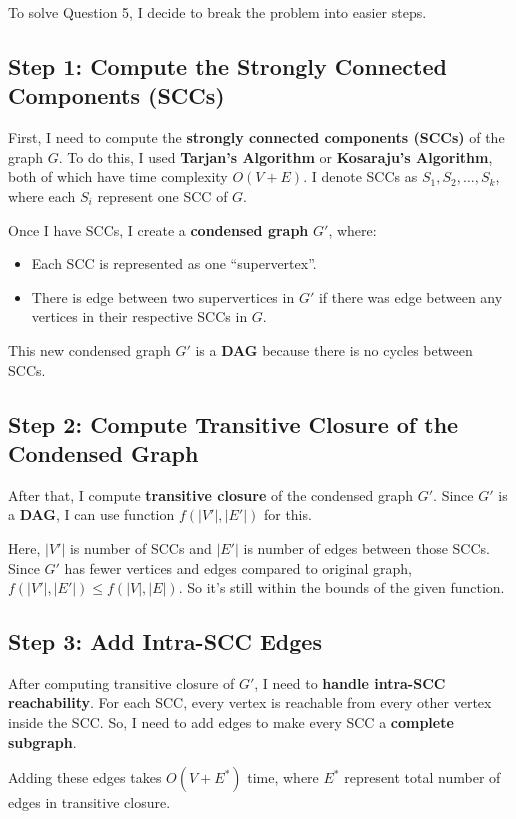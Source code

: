 \documentclass[10pt,letter,notitlepage]{article}
\begin{document}
\begin{Answer}

To solve Question 5, I decide to break the problem into easier steps.


\subsection*{Step 1: Compute the Strongly Connected Components (SCCs)}
First, I need to compute the \textbf{strongly connected components (SCCs)} of the graph $G$. To do this, I used \textbf{Tarjan's Algorithm} or \textbf{Kosaraju's Algorithm}, both of which have time complexity $O(V + E)$. I denote SCCs as $S_1, S_2, \dots, S_k$, where each $S_i$ represent one SCC of $G$.

Once I have SCCs, I create a \textbf{condensed graph} $G'$, where:
\begin{itemize}
    \item Each SCC is represented as one ``supervertex''.
    \item There is edge between two supervertices in $G'$ if there was edge between any vertices in their respective SCCs in $G$.
\end{itemize}

This new condensed graph $G'$ is a \textbf{DAG} because there is no cycles between SCCs.

\subsection*{Step 2: Compute Transitive Closure of the Condensed Graph}
After that, I compute \textbf{transitive closure} of the condensed graph $G'$. Since $G'$ is a \textbf{DAG}, I can use function $f(|V'|, |E'|)$ for this.

Here, $|V'|$ is number of SCCs and $|E'|$ is number of edges between those SCCs. Since $G'$ has fewer vertices and edges compared to original graph, $f(|V'|, |E'|) \leq f(|V|, |E|)$. So it’s still within the bounds of the given function.

\subsection*{Step 3: Add Intra-SCC Edges}
After computing transitive closure of $G'$, I need to \textbf{handle intra-SCC reachability}. For each SCC, every vertex is reachable from every other vertex inside the SCC. So, I need to add edges to make every SCC a \textbf{complete subgraph}.

Adding these edges takes $O(V + E^*)$ time, where $E^*$ represent total number of edges in transitive closure.


\end{Answer}
\end{document}
